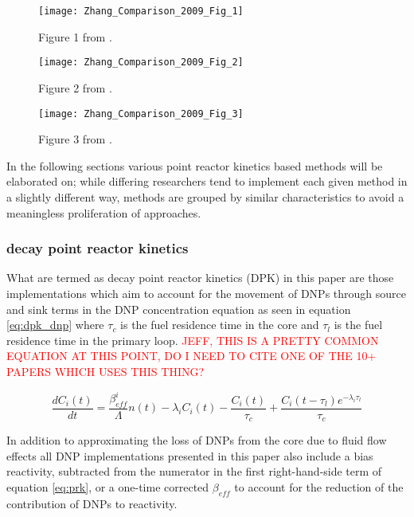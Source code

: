 \documentclass[review]{elsarticle}
\begin{document}
\begin{figure}[h]
   \centering
   \texttt{[image: Zhang\_Comparison\_2009\_Fig\_1]}
   \caption{Figure 1 from \cite{zhang_comparison_2009}.} 
   \label{fig:zhang_prk_flow}
\end{figure}

\begin{figure}[h]
   \centering
   \texttt{[image: Zhang\_Comparison\_2009\_Fig\_2]}
   \caption{Figure 2 from \cite{zhang_comparison_2009}.} 
   \label{fig:zhang_prk_temp}
\end{figure}

\begin{figure}[h]
   \centering
   \texttt{[image: Zhang\_Comparison\_2009\_Fig\_3]}
   \caption{Figure 3 from \cite{zhang_comparison_2009}.} 
   \label{fig:zhang_prk_reac}
\end{figure}

In the following
sections various point reactor kinetics based methods will be elaborated on;
 while differing researchers
tend to implement each given method in a slightly different way, methods are
grouped by similar characteristics to avoid a meaningless proliferation of
approaches.

\subsubsection{decay point reactor kinetics} \label{sssec:dpk}
What are termed as
decay point reactor kinetics (DPK) in this paper are those implementations
which aim to account for the movement of DNPs through source and sink terms
in the DNP concentration equation as seen in equation \ref{eq:dpk_dnp}
where $\tau_{c}$ is the fuel residence time in the core and $\tau_{l}$ is the
fuel residence time in the primary loop.
\textcolor{red}{JEFF, THIS IS A PRETTY COMMON EQUATION AT THIS POINT,
DO I NEED TO CITE ONE OF THE 10+ PAPERS WHICH USES THIS THING?}

\begin{equation}
    \label{eq:dpk_dnp}
    \frac{dC_{i}(t)}{dt} = \frac{\beta_{eff}^{i}}{\Lambda} n(t) -
        \lambda_{i} C_{i}(t) - \frac{C_{i}(t)}{\tau_{c}} +
        \frac{C_{i}(t - \tau_{l}) e^{-\lambda_{i} \tau_{l}}}{\tau_{c}}
\end{equation}

In addition to approximating the loss of DNPs from the core due to fluid
flow effects all DNP implementations presented in this paper also include
a bias reactivity, subtracted from the numerator in the first right-hand-side
term of equation \ref{eq:prk}, or a one-time corrected $\beta_{eff}$ to account
for the reduction of the contribution of DNPs to reactivity.
\end{document}
